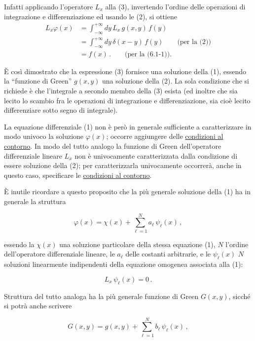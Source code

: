 \documentclass[11pt, a4paper]{book}
\numberwithin{equation}{section}
\begin{document}
Infatti applicando l'operatore $L_x$ alla (3), invertendo l'ordine delle operazioni di integrazione e differenziazione ed usando le (2), si ottiene
\begin{align*}
    L_x \varphi(x) &= \int_{-\infty}^{+\infty} dy \, L_x \, g(x,y) \, f(y) \\
                   &= \int_{-\infty}^{+\infty} dy \, \delta(x-y) \, f(y) \qquad \text{(per la (2))} \\
                   &= f(x) \,. \qquad \text{(per la (6.1-1))}.
\end{align*}

È così dimostrato che la espressione (3) fornisce una soluzione della (1), essendo la ``funzione di Green'' $g(x,y)$ una soluzione della (2). La sola condizione che si richiede è che l'integrale a secondo membro della (3) esista (ed inoltre che sia lecito lo scambio fra le operazioni di integrazione e differenziazione, sia cioè lecito differenziare sotto segno di integrale).

La equazione differenziale (1) non è però in generale sufficiente a caratterizzare in modo univoco la soluzione $\varphi(x)$; occorre aggiungere delle \uline{condizioni al contorno}. In modo del tutto analogo la funzione di Green dell'operatore differenziale lineare $L_x$ non è univocamente caratterizzata dalla condizione di essere soluzione della (2); per caratterizzarla univocamente occorrerà, anche in questo caso, specificare le \uline{condizioni al contorno}.

È inutile ricordare a questo proposito che la più generale soluzione della (1) ha in generale la struttura

\begin{equation}
    \varphi(x) = \chi(x) + \sum_{\ell=1}^{N} a_\ell \, \psi_\ell(x) \,,
\end{equation}

essendo la $\chi(x)$ una soluzione particolare della stessa equazione (1), $N$ l'ordine dell'operatore differenziale lineare, le $a_\ell$ delle costanti arbitrarie, e le $\psi_\ell(x)$ $N$ soluzioni linearmente indipendenti della equazione omogenea associata alla (1):

\begin{equation}
    L_x \, \psi_\ell(x) = 0 \,.
\end{equation}

Struttura del tutto analoga ha la più generale funzione di Green $G(x,y)$, sicché si potrà anche scrivere

\begin{equation}
    G(x,y) = g(x,y) + \sum_{\ell=1}^{N} b_\ell \, \psi_\ell(x) \,,
\end{equation}
\end{document}
